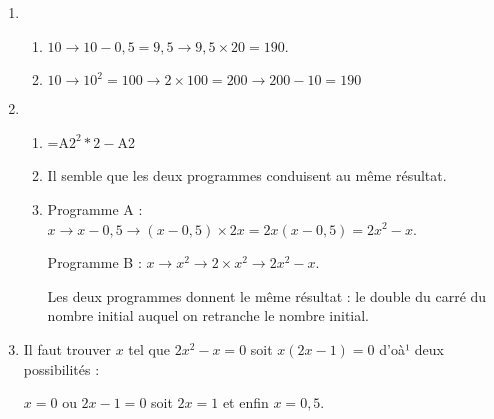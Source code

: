 \begin{enumerate}
\item 
	\begin{enumerate}
		\item %
$10 \to 10 - 0,5 = 9,5 \to 9,5 \times 20 = 190$.
		\item %
$10 \to 10^2 = 100 \to 2 \times 100 = 200 \to 200 - 10 = 190$
	\end{enumerate} 
\item %

	\begin{enumerate}
		\item %
=A$2^2 *2 - $A2 
		\item %
Il semble que les deux programmes conduisent au même résultat. 
		\item %
Programme A : $x \to x - 0,5 \to (x - 0,5) \times 2x = 2x(x - 0,5) = 2x^2 - x$.

Programme B : $x \to x^2 \to 2 \times x^2 \to 2x^2 - x$.

Les deux programmes donnent le même résultat : le double du carré du nombre initial auquel on retranche le nombre initial. 
	\end{enumerate}
\item %
Il faut trouver $x$ tel que $2x^2 - x = 0$ soit $x(2x - 1) = 0$ d'oà¹ deux possibilités :

$x = 0$ ou $2x - 1 = 0$ soit $2x = 1$ et enfin $x = 0,5$.
\end{enumerate}
\bigskip
 
